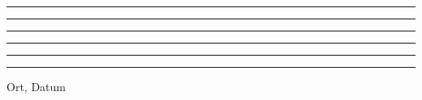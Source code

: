 \documentclass[a4paper,12pt]{scrartcl}
\begin{document}
\begin{center}
	\rule{6cm}{.5pt} \hspace{3cm} \rule{6cm}{.5pt}
\end{center}
\vspace{1cm}
\begin{center}
	\rule{6cm}{.5pt} \hspace{3cm} \rule{6cm}{.5pt}
\end{center}

\vspace{3cm}
	\begin{center}
	\rule{6cm}{.5pt} \hspace{3cm} \rule{6cm}{0pt}
\end{center}	
\vspace{-5mm}
\hspace*{25mm} Ort, Datum	
\end{document}
